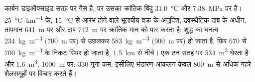 कार्बन डाइऑक्साइड सतह पर गैस है, पर उसका क्रांतिक बिंदु \qty{31.0}{\celsius} और
\qty{7.38}{MPa} पर है। \qty{25}{\celsius\per\km} के, \qty{15}{\celsius} से आरंभ होने वाले भूतापीय वक्र के अनुदिश,
द्रवस्थैतिक दाब के अधीन, तापमान \qty{641}{m} पर और दाब \qty{742}{m} पर क्रांतिक मान को पार करता है;
शुद्ध  का घनत्व \qty{234}{kg.m^{-3}} (\qty{700}{m} पर) से उछलकर \qty{583}{kg.m^{-3}} (\qty{900}{m}
पर) हो जाता है, फिर 670 से \qty{700}{kg.m^{-3}} के निकट स्थिर हो जाता है, \qty{1.5}{km} से नीचे। एक टन
सतह पर \qty{534}{m^3} घेरता है और \qty{1.6}{m^3}, \qty{1000}{m} पर: 330 गुना कम; इसीलिए
भंडारण-आकलन केवल \qty{800}{m} से अधिक गहरे शैलसमूहों पर विचार
करते हैं।

